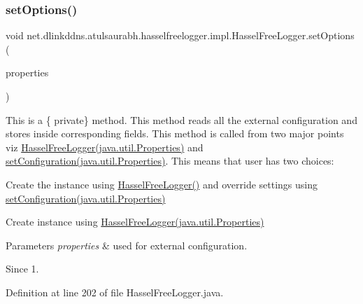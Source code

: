 \subsubsection{\texorpdfstring{set\+Options()}{setOptions()}}
{\footnotesize\ttfamily void net.\+dlinkddns.\+atulsaurabh.\+hasselfreelogger.\+impl.\+Hassel\+Free\+Logger.\+set\+Options (\begin{DoxyParamCaption}\item[{Properties}]{properties }\end{DoxyParamCaption})\hspace{0.3cm}{\ttfamily [private]}}

This is a \{ private\} method. This method reads all the external configuration and stores inside corresponding fields. This method is called from two major points viz \mbox{\hyperlink{}{Hassel\+Free\+Logger(java.\+util.\+Properties)}} and \mbox{\hyperlink{}{set\+Configuration(java.\+util.\+Properties)}}. This means that user has two choices\+: 
\begin{DoxyItemize}
\item Create the instance using \mbox{\hyperlink{classnet_1_1dlinkddns_1_1atulsaurabh_1_1hasselfreelogger_1_1impl_1_1_hassel_free_logger_a603e83e38bc2c011dd3e5edf074acb1d}{Hassel\+Free\+Logger()}} and override settings using \mbox{\hyperlink{}{set\+Configuration(java.\+util.\+Properties)}} 
\item Create instance using \mbox{\hyperlink{}{Hassel\+Free\+Logger(java.\+util.\+Properties)}} 
\end{DoxyItemize}
\begin{DoxyParams}{Parameters}
{\em properties} & used for external configuration. \\
\hline
\end{DoxyParams}
\begin{DoxySince}{Since}
1. 
\end{DoxySince}


Definition at line 202 of file Hassel\+Free\+Logger.\+java.

\mbox{\label{classnet_1_1dlinkddns_1_1atulsaurabh_1_1hasselfreelogger_1_1impl_1_1_hassel_free_logger_a9ef8b4f7c9615f50c03f168f1b949f64}} 
